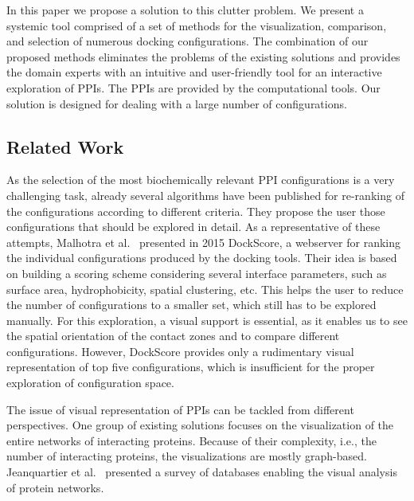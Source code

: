 \documentclass{bmcart}
\begin{document}
In this paper we propose a solution to this clutter problem.
We present a systemic tool comprised of a set of methods for the visualization, comparison, and selection of numerous docking configurations.
The combination of our proposed methods eliminates the problems of the existing solutions and provides the domain experts with an intuitive and user-friendly tool for an interactive exploration of PPIs.
The PPIs are provided by the computational tools.
Our solution is designed for dealing with a large number of configurations. 

\subsection*{Related Work}
As the selection of the most biochemically relevant PPI configurations is a very challenging task, already several algorithms have been published for re-ranking of the configurations according to different criteria.
They propose the user those configurations that should be explored in detail.
As a representative of these attempts, Malhotra et al.~\cite{Malhotra2015} presented in 2015 DockScore, a webserver for ranking the individual configurations produced by the docking tools. 
Their idea is based on building a scoring scheme considering several interface parameters, such as surface area, hydrophobicity, spatial clustering, etc.
This helps the user to reduce the number of configurations to a smaller set, which still has to be explored manually.
For this exploration, a visual support is essential, as it enables us to see the spatial orientation of the contact zones and to compare different configurations.
However, DockScore provides only a rudimentary visual representation of top five configurations, which is insufficient for the proper exploration of configuration space.
 
The issue of visual representation of PPIs can be tackled from different perspectives.
One group of existing solutions focuses on the visualization of the entire networks of interacting proteins.
Because of their complexity, i.e., the number of interacting proteins, the visualizations are mostly graph-based.
Jeanquartier et al.~\cite{Jeanquartier2015} presented a survey of databases enabling the visual analysis of protein networks.
\end{document}
